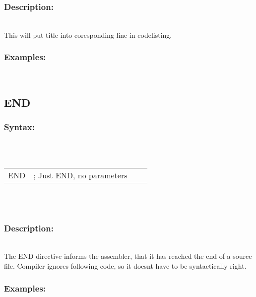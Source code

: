         \subsubsection{Description:}\\
        This will put title into coresponding line in codelisting.  \\
        \subsubsection{Examples:}\\
                \begin{code}[h!]
                    directive}\verb'WARNING'}\verb'    '
                    constant}\verb'"Text, that will show up in the codelisting"'}
                \end{code}

        \subsection{END}
        \subsubsection{Syntax:}\\
        \\ {
                \texttt{}
                \begin{tabular}[h!]{llll}
                        { \color{highlight_directive} END } &
                        { \color{highlight_comment} ; Just END, no parameters }\\
                \end{tabular}
            }\\
            \\
        \subsubsection{Description:}\\
        The END directive informs the assembler, that it has reached the end of a source file. Compiler ignores following code, so it doesnt have to be
        syntactically right.

        \subsubsection{Examples:}\\
            \begin{code}[h!]
                \verb'    'directive}\verb'END'}
                \caption{END directive}
            \end{code}

